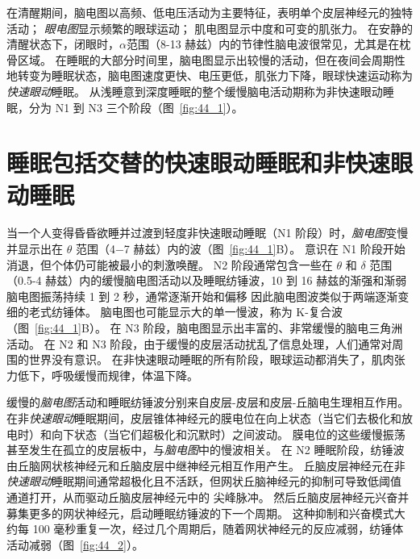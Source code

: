 在清醒期间，脑电图以高频、低电压活动为主要特征，表明单个皮层神经元的独特活动；
\textit{眼电图}显示频繁的眼球运动；
肌电图显示中度和可变的肌张力。
在安静的清醒状态下，闭眼时，$ \alpha $范围（8-13 赫兹）内的节律性脑电波很常见，尤其是在枕骨区域。
在睡眠的大部分时间里，脑电图显示出较慢的活动，但在夜间会周期性地转变为睡眠状态，脑电图速度更快、电压更低，肌张力下降，眼球快速运动称为\textit{快速眼动}睡眠。
从浅睡意到深度睡眠的整个缓慢脑电活动期称为非快速眼动睡眠，分为 N1 到 N3 三个阶段（图~\ref{fig:44_1}）。



\section{睡眠包括交替的快速眼动睡眠和非快速眼动睡眠}

当一个人变得昏昏欲睡并过渡到轻度非快速眼动睡眠（N1 阶段）时，\textit{脑电图}变慢并显示出在 $ \theta $ 范围（4−7 赫兹）内的波（图~\ref{fig:44_1}B）。
意识在 N1 阶段开始消退，但个体仍可能被最小的刺激唤醒。
N2 阶段通常包含一些在 $ \theta $ 和 $ \delta $ 范围（0.5-4 赫兹）内的缓慢脑电图活动以及睡眠纺锤波，10 到 16 赫兹的渐强和渐弱脑电图振荡持续 1 到 2 秒，通常逐渐开始和偏移 因此脑电图波类似于两端逐渐变细的老式纺锤体。
脑电图也可能显示大的单一慢波，称为 K-复合波（图~\ref{fig:44_1}B）。
在 N3 阶段，脑电图显示出丰富的、非常缓慢的脑电三角洲活动。
在 N2 和 N3 阶段，由于缓慢的皮层活动扰乱了信息处理，人们通常对周围的世界没有意识。
在非快速眼动睡眠的所有阶段，眼球运动都消失了，肌肉张力低下，呼吸缓慢而规律，体温下降。


缓慢的\textit{脑电图}活动和睡眠纺锤波分别来自皮层-皮层和皮层-丘脑电生理相互作用。
在非\textit{快速眼动}睡眠期间，皮层锥体神经元的膜电位在向上状态（当它们去极化和放电时）和向下状态（当它们超极化和沉默时）之间波动。
膜电位的这些缓慢振荡甚至发生在孤立的皮层板中，与\textit{脑电图}中的慢波相关。
在 N2 睡眠阶段，纺锤波由丘脑网状核神经元和丘脑皮层中继神经元相互作用产生。
丘脑皮层神经元在非\textit{快速眼动}睡眠期间通常超极化且不活跃，但网状丘脑神经元的抑制可导致低阈值  通道打开，从而驱动丘脑皮层神经元中的  尖峰脉冲。
然后丘脑皮层神经元兴奋并募集更多的网状神经元，启动睡眠纺锤波的下一个周期。
这种抑制和兴奋模式大约每 100 毫秒重复一次，经过几个周期后，随着网状神经元的反应减弱，纺锤体活动减弱（图~\ref{fig:44_2}）。


